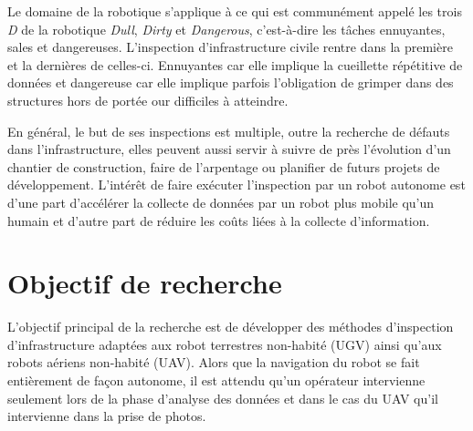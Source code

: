 \label{sec:Introduction}  %
Le domaine de la robotique s'applique à ce qui est communément appelé les trois \emph{D} de la robotique \emph{Dull}, \emph{Dirty} et \emph{Dangerous}, c'est-à-dire les tâches ennuyantes, sales et dangereuses. L'inspection d'infrastructure civile rentre dans la première et la dernières de celles-ci. Ennuyantes car elle implique la cueillette répétitive de données et dangereuse car elle implique parfois l'obligation de grimper dans des structures hors de portée our difficiles à atteindre.

En général, le but de ses inspections est multiple, outre la recherche de défauts dans l'infrastructure, elles peuvent aussi servir à suivre de près l'évolution d'un chantier de construction, faire de l'arpentage ou planifier de futurs projets de développement. L'intérêt de faire exécuter l'inspection par un robot autonome est d'une part d'accélérer la collecte de données par un robot plus mobile qu'un humain et d'autre part de réduire les coûts liées à la collecte d'information.



\section{Objectif de recherche}

L'objectif principal de la recherche est de développer des méthodes d'inspection d'infrastructure adaptées aux robot terrestres non-habité (UGV) ainsi qu'aux robots aériens non-habité (UAV). Alors que la navigation du robot se fait entièrement de façon autonome, il est attendu qu'un opérateur intervienne seulement lors de la phase d'analyse des données et dans le cas du UAV qu'il intervienne dans la prise de photos.

